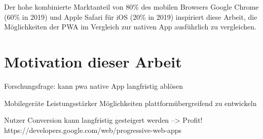 Der hohe kombinierte Marktanteil von 80\% des mobilen Browsers Google Chrome (60\% in 2019) und Apple Safari für iOS (20\% in 2019) inspiriert diese Arbeit, die Möglichkeiten der PWA im Vergleich zur nativen App ausführlich zu vergleichen. 
\cite{StatistaMobileBrowserMarketShare}








\section{Motivation dieser Arbeit}
Forschungsfrage: kann \ac{pwa} native App langfristig ablösen

Mobilegeräte Leistungsstärker
Möglichkeiten plattformübergreifend zu entwickeln

Nutzer Conversion kann langfristig gesteigert werden --> Profit!\\
https://developers.google.com/web/progressive-web-apps
\cite{GooglePWAOverview}



